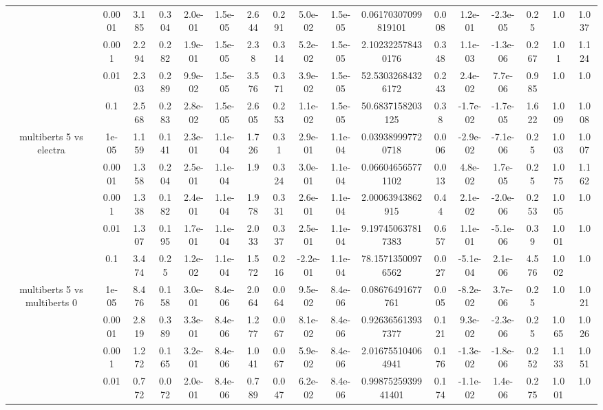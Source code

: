 \begin{tabular}{|c|c|c|c|c|c|c|c|c|c|c|c|c|c|c|c|c|}
 & 0.0001 & 3.185 & 0.304 & 2.0e-01 & 1.5e-05 & 2.644 & 0.291 & 5.0e-02 & 1.5e-05 & 0.06170307099819101 & 0.008 & 1.2e-01 & -2.3e-05 & 0.25 & 1.0 & 1.037 \\
 & 0.001 & 2.294 & 0.282 & 1.9e-01 & 1.5e-05 & 2.38 & 0.314 & 5.2e-02 & 1.5e-05 & 2.102322578430176 & 0.348 & 1.1e-03 & -1.3e-06 & 0.267 & 1.01 & 1.124 \\
 & 0.01 & 2.303 & 0.289 & 9.9e-02 & 1.5e-05 & 3.576 & 0.371 & 3.9e-02 & 1.5e-05 & 52.53032684326172 & 0.243 & 2.4e-02 & 7.7e-06 & 0.985 & 1.0 & 1.0 \\
 & 0.1 & 2.568 & 0.283 & 2.8e-02 & 1.5e-05 & 2.605 & 0.253 & 1.1e-02 & 1.5e-05 & 50.6837158203125 & 0.38 & -1.7e-02 & -1.7e-05 & 1.622 & 1.009 & 1.008 \\
\hline
\multirow{5}{*}{multiberts 5 vs electra } & 1e-05 & 1.159 & 0.141 & 2.3e-01 & 1.1e-04 & 1.726 & 0.31 & 2.9e-01 & 1.1e-04 & 0.039389997720718 & 0.006 & -2.9e-02 & -7.1e-06 & 0.25 & 1.003 & 1.007 \\
 & 0.0001 & 1.358 & 0.204 & 2.5e-01 & 1.1e-04 & 1.9 & 0.324 & 3.0e-01 & 1.1e-04 & 0.066046565771102 & 0.013 & 4.8e-02 & 1.7e-05 & 0.25 & 1.075 & 1.162 \\
 & 0.001 & 1.338 & 0.182 & 2.4e-01 & 1.1e-04 & 1.978 & 0.331 & 2.6e-01 & 1.1e-04 & 2.00063943862915 & 0.44 & 2.1e-02 & -2.0e-06 & 0.253 & 1.005 & 1.0 \\
 & 0.01 & 1.307 & 0.195 & 1.7e-01 & 1.1e-04 & 2.033 & 0.337 & 2.5e-01 & 1.1e-04 & 9.197450637817383 & 0.657 & 1.1e-01 & -5.1e-06 & 0.39 & 1.001 & 1.0 \\
 & 0.1 & 3.474 & 0.25 & 1.2e-02 & 1.1e-04 & 1.572 & 0.216 & -2.2e-01 & 1.1e-04 & 78.15713500976562 & 0.027 & -5.1e-04 & 2.1e-06 & 4.576 & 1.002 & 1.0 \\
\hline
\multirow{5}{*}{multiberts 5 vs multiberts 0} & 1e-05 & 8.476 & 0.158 & 3.0e-01 & 8.4e-06 & 2.064 & 0.064 & 9.5e-02 & 8.4e-06 & 0.08676491677761 & 0.005 & -8.2e-02 & 3.7e-06 & 0.25 & 1.0 & 1.021 \\
 & 0.0001 & 2.819 & 0.389 & 3.3e-01 & 8.4e-06 & 1.277 & 0.067 & 8.1e-02 & 8.4e-06 & 0.926365613937377 & 0.121 & 9.3e-02 & -2.3e-06 & 0.25 & 1.065 & 1.026 \\
 & 0.001 & 1.272 & 0.165 & 3.2e-01 & 8.4e-06 & 1.041 & 0.067 & 5.9e-02 & 8.4e-06 & 2.016755104064941 & 0.176 & -1.3e-02 & -1.8e-06 & 0.252 & 1.133 & 1.051 \\
 & 0.01 & 0.772 & 0.072 & 2.0e-01 & 8.4e-06 & 0.789 & 0.047 & 6.2e-02 & 8.4e-06 & 0.9987525939941401 & 0.174 & -1.1e-02 & 1.4e-06 & 0.275 & 1.001 & 1.0 \\

\end{tabular}
